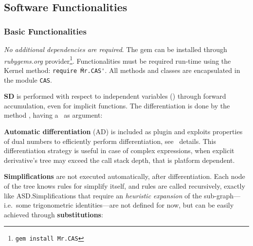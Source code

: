 \subsection{Software Functionalities}
\label{sec:functionalities}

\subsubsection{Basic Functionalities}

\emph{No additional dependencies are required}. The gem can be installed through \emph{rubygems.org} provider\footnote{\texttt{gem install Mr.CAS}}. Functionalities must be required run-time using the Kernel method: \texttt{require \'Mr.CAS\'}. All methods and classes are encapsulated in the module \texttt{CAS}.


\textbf{SD} is performed with respect to independent variables (\CASVariable) through forward accumulation, even for implicit functions. The differentiation is done by the method \CASOpdiff, having a \CASVariable~as argument:

\noindent%


\textbf{Automatic differentiation} (AD) is included as plugin and exploits properties of dual numbers to efficiently perform differentiation, see~\cite{bartholomew2000automatic} details. This differentiation strategy is useful in case of complex expressions, when explicit derivative's tree may exceed the call stack depth, that is platform dependent.

\textbf{Simplifications} are not executed automatically, after differentiation. Each node of the tree knows rules for simplify itself, and rules are called recursively, exactly like ASD.\@ Simplifications that require an \emph{heuristic expansion} of the sub-graph---i.e.\ some trigonometric identities---are not defined for now, but can be easily achieved through \textbf{substitutions}:

